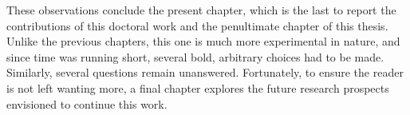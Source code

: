 These observations conclude the present chapter, which is the last to report the contributions of this doctoral work and the penultimate chapter of this thesis. Unlike the previous chapters, this one is much more experimental in nature, and since time was running short, several bold, arbitrary choices had to be made. Similarly, several questions remain unanswered. Fortunately, to ensure the reader is not left wanting more, a final chapter explores the future research prospects envisioned to continue this work.
